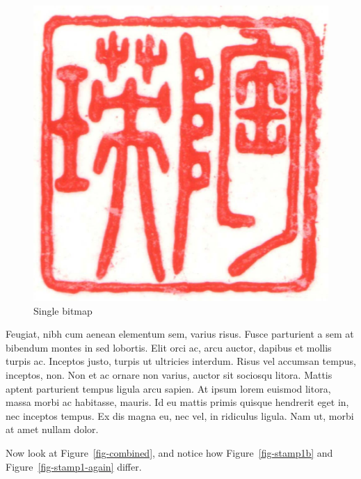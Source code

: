 \documentclass[
  9pt,
  letterpaper,
  DIV=11,
  numbers=noendperiod]{scrartcl}
\begin{document}
\begin{figure}

{\centering \includegraphics{stamp1a.jpg}

}

\caption{\label{fig-stamp1a}Single bitmap}

\end{figure}

Feugiat, nibh cum aenean elementum sem, varius risus. Fusce parturient a
sem at bibendum montes in sed lobortis. Elit orci ac, arcu auctor,
dapibus et mollis turpis ac. Inceptos justo, turpis ut ultricies
interdum. Risus vel accumsan tempus, inceptos, non. Non et ac ornare non
varius, auctor sit sociosqu litora. Mattis aptent parturient tempus
ligula arcu sapien. At ipsum lorem euismod litora, massa morbi ac
habitasse, mauris. Id eu mattis primis quisque hendrerit eget in, nec
inceptos tempus. Ex dis magna eu, nec vel, in ridiculus ligula. Nam ut,
morbi at amet nullam dolor.

Now look at Figure~\ref{fig-combined}, and notice how
Figure~\ref{fig-stamp1b} and Figure~\ref{fig-stamp1-again} differ.
\end{document}
